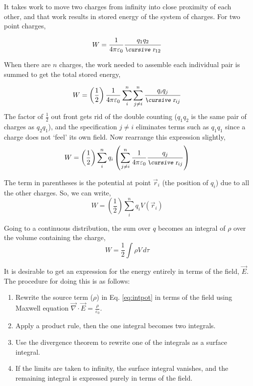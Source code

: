\documentclass[12pt]{article}
\begin{document}
\begin{flushleft}
It takes work to move two charges from infinity into close proximity of each other, and that work results in stored energy of the system of charges.  For two point charges,

 \[
 W = \frac{1}{4\pi \varepsilon_{0}} \frac{q_{1}q_{2}}{\text{\small\slshape\cursive r}_{12}}
 \] 

When there are $n$ charges, the work needed to assemble each individual pair is summed to get the total stored energy,

 \[
 W = \left( \frac{1}{2} \right) \frac{1}{4\pi \varepsilon_{0}} \sum_{i}^{n} \sum_{j\ne i}^{n} \frac{q_{i}q_{j}}{\text{\small\slshape\cursive r}_{ij}}
 \] 
The factor of $\frac{1}{2}$ out front gets rid of the double counting ($q_{1}q_{2}$ is the same pair of charges as $q_{2}q_{1}$), and the specification $j \ne i$ eliminates terms such as $q_{1}q_{1}$ since a charge does not `feel' its own field.  Now rearrange this expression slightly,
\[
 W = \left( \frac{1}{2} \right)  \sum_{i}^{n} q_{i} \left( \sum_{j\ne i}^{n} \frac{1}{4\pi \varepsilon_{0}} \frac{q_{j}}{\text{\small\slshape\cursive r}_{ij}} \right)
 \] 

The term in parentheses is the potential at point $\vec{r}_{i}$ (the position of $q_{i}$) due to all the other charges.  So, we can write,
\[
 W = \left( \frac{1}{2} \right)  \sum_{i}^{n} q_{i} V(\vec{r}_{i})
 \] 

Going to a continuous distribution, the sum over $q$ becomes an integral of $\rho$ over the volume containing the charge,
\begin{equation}
 W = \frac{1}{2}   \int \rho V \, d\tau
 \label{eq:intpot}
 \end{equation} 

It is desirable to get an expression for the energy entirely in terms of the field, $\vec{E}$.  The procedure for doing this is as follows:
\begin{enumerate}
\item Rewrite the source term ($\rho$) in Eq. \ref{eq:intpot} in terms of the field using Maxwell equation $\vec{\nabla} \cdot \vec{E} = \frac{\rho}{\varepsilon_{0}}$.
\item Apply a product rule, then the one integral becomes two integrals.
\item Use the divergence theorem to rewrite one of the integrals as a surface integral.
\item If the limits are taken to infinity, the surface integral vanishes, and the remaining integral is expressed purely in terms of the field. 
\end{enumerate}


\end{flushleft}
\end{document}
